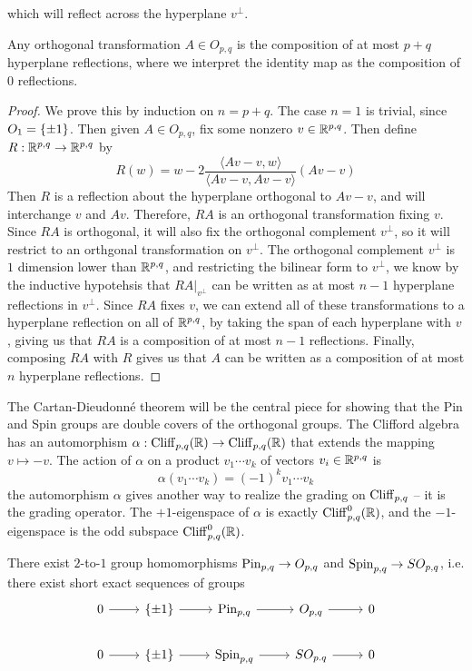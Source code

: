 which will reflect across the hyperplane $v^\perp$.
%
\begin{thm}
Any orthogonal transformation $A \in O_{p,q}$ is the composition
of at most $p+q$ hyperplane reflections, where we interpret the identity map as the
composition of $0$ reflections.
\end{thm}
%
\begin{proof}
We prove this by induction on $n = p+q$. The case $n=1$ is trivial, since
$O_1 = \left\lbrace \pm 1 \right\rbrace$. Then given $A \in O_{p,q}$, fix some nonzero $v \in \mathbb{R}^{p,q}$.
Then define $R : \mathbb{R}^{p,q} \to \mathbb{R}^{p,q}$ by
\[
R(w) = w - 2 \frac{\langle Av - v,w \rangle}{\langle Av -v, Av - v\rangle}(Av - v)
\]
Then $R$ is a reflection about the hyperplane orthogonal to $Av - v$,
and will interchange $v$ and $Av$. Therefore, $RA$ is an orthogonal transformation
fixing $v$. Since $RA$ is orthogonal, it will also fix the orthogonal complement
$v^\perp$, so it will restrict to an orthgonal transformation on $v^\perp$. The
orthogonal complement $v^\perp$ is $1$ dimension lower than $\mathbb{R}^{p,q}$, and restricting
the bilinear form to $v^\perp$, we know by the inductive hypotehsis that
$RA\vert_{v^\perp}$ can be written as at most $n-1$ hyperplane reflections in
$v^\perp$. Since $RA$ fixes $v$, we can extend all of these transformations to
a hyperplane reflection on all of $\mathbb{R}^{p,q}$, by taking the span of each hyperplane
with $v$, giving us that $RA$ is a composition of at most $n-1$ reflections. Finally,
composing $RA$ with $R$ gives us that $A$ can be written as a composition of at most
$n$ hyperplane reflections.
\end{proof}
The Cartan-Dieudonn\'e theorem will be the central piece for showing that the
Pin and Spin groups are double covers of the orthogonal groups. The Clifford
algebra has an automorphism
$\alpha : \operatorname{Cliff}_{p,q}(\mathbb{R}) \to \operatorname{Cliff}_{p,q}(\mathbb{R})$ that extends the mapping
$v \mapsto -v$. The action of $\alpha$ on a product $v_1\cdots v_k$ of vectors
$v_i \in \mathbb{R}^{p,q}$ is
\[
\alpha(v_1\cdots v_k) = (-1)^k v_1\cdots v_k
\]
the automorphism $\alpha$ gives another way to realize the grading on
$\operatorname{Cliff}_{p,q}$ -- it is the grading operator. The $+1$-eigenspace of $\alpha$
is exactly $\operatorname{Cliff}_{p,q}^0(\mathbb{R})$, and the $-1$-eigenspace is the odd subspace
$\operatorname{Cliff}_{p,q}^0(\mathbb{R})$.
%
\begin{thm}
There exist $2$-to-$1$ group homomorphisms $\mathrm{Pin}_{p,q} \to O_{p,q}$ and
$\mathrm{Spin}_{p,q} \to SO_{p,q}$, i.e. there exist short exact sequences of groups
\[\begin{tikzcd}
0 \ar[r] & \set{\pm 1} \ar[r] & \Pin_{p,q} \ar[r] & O_{p,q} \ar[r] & 0 \\
0 \ar[r] & \set{\pm 1} \ar[r] &\Spin_{p,q} \ar[r] & SO_{p.q} \ar[r] & 0
\end{tikzcd}\]
\end{thm}
